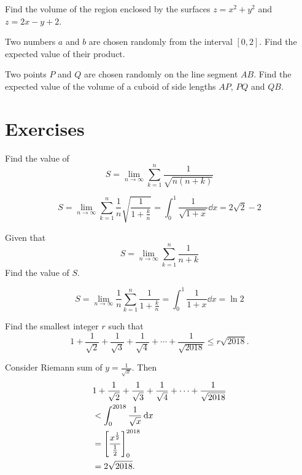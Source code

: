 \begin{exercise}
Find the volume of the region enclosed by the surfaces $z=x^2+y^2$ and $z=2x-y+2$.
\end{exercise}

\begin{exercise}
Two numbers $a$ and $b$ are chosen randomly from the interval $[0,2]$. Find the expected value of their product.
\end{exercise}

\begin{exercise}
Two points $P$ and $Q$ are chosen randomly on the line segment $AB$. Find the expected value of the volume of a cuboid of side lengths $AP$, $PQ$ and $QB$.
\end{exercise}
\pagebreak

\section*{Exercises}
\begin{prbm}
Find the value of 
\[ S = \lim_{n \to \infty} \sum_{k=1}^{n} \frac{1}{\sqrt{n(n+k)}} \]
\end{prbm}
    
\begin{solution}
\[ S = \lim_{n \to \infty} \sum_{k=1}^{n} \frac{1}{n} \sqrt{\frac{1}{1+\frac{k}{n}}} = \int_{0}^{1} \frac{1}{\sqrt{1+x}} \dd{x} = \boxed{2\sqrt{2}-2} \]
\end{solution}

\begin{prbm}
Given that
\[ S=\lim_{n\to\infty}\sum_{k=1}^n\frac{1}{n+k} \]
Find the value of $S$.
\end{prbm}

\begin{solution}
\[ S = \lim_{n\to\infty}\frac{1}{n}\sum_{k=1}^n\frac{1}{1+\frac{k}{n}} = \int_0^1\frac{1}{1+x}\dd{x} = \boxed{\ln2} \]
\end{solution}

\begin{prbm}
Find the smallest integer $r$ such that
\[1+\frac{1}{\sqrt{2}}+\frac{1}{\sqrt{3}}+\frac{1}{\sqrt{4}}+\cdots+\frac{1}{\sqrt{2018}}\le r\sqrt{2018}.\]
\end{prbm}

\begin{solution}
Consider Riemann sum of $y=\frac{1}{\sqrt{x}}$. Then
\begin{align*}
&1+\frac{1}{\sqrt{2}}+\frac{1}{\sqrt{3}}+\frac{1}{\sqrt{4}}+\cdots+\frac{1}{\sqrt{2018}}\\
&<\int_{0}^{2018}\frac{1}{\sqrt{x}}\dd{x}\\
&=\left[\frac{x^\frac{1}{2}}{\frac{1}{2}}\right]_{0}^{2018}\\
&=2\sqrt{2018}.
\end{align*}
\end{solution}

